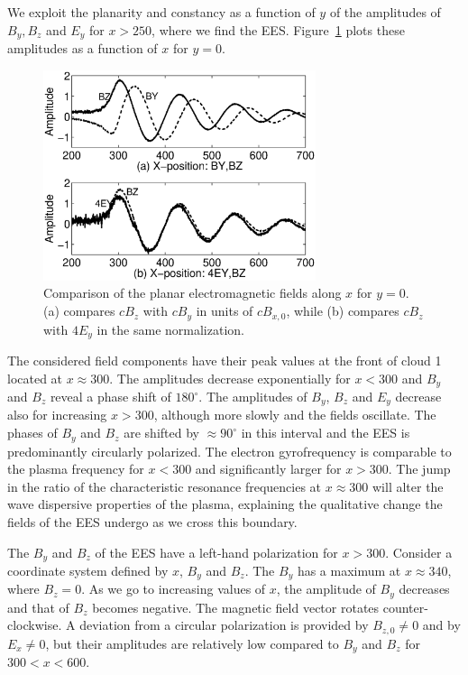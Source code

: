 \documentclass[structabstract]{aa}
\begin{document}
We exploit the planarity and constancy as a function of $y$ of the 
amplitudes of $B_y,B_z$ and $E_y$ for $x>250$, where we find the EES. 
Figure~\ref{Fig3} plots these amplitudes as a function of $x$ for $y=0$.
\begin{figure}
\centering
\includegraphics[width=8cm]{Fig3.eps}
\caption{Comparison of the planar electromagnetic fields along $x$ for 
$y=0$. (a) compares $cB_z$ with $cB_y$ in units of $cB_{x,0}$, while (b) 
compares $cB_z$ with $4E_y$ in the same normalization.}\label{Fig3}
\end{figure}
The considered field components have their peak values at the front 
of cloud 1 located at $x \approx 300$. The amplitudes decrease
exponentially for $x<300$ and $B_y$ and $B_z$ reveal a phase shift of
$180^\circ$. The amplitudes of $B_y$, $B_z$ and $E_y$ decrease also for 
increasing $x>300$, although more slowly and the fields oscillate. The 
phases of $B_y$ and $B_z$ are shifted by $\approx 90^\circ$ in this 
interval and the EES is predominantly 
circularly polarized. The electron gyrofrequency is comparable to the plasma 
frequency for $x<300$ and significantly larger for $x>300$. The jump in the 
ratio of the characteristic resonance frequencies at $x\approx 300$ will 
alter the wave dispersive properties of the plasma, explaining the qualitative
change the fields of the EES undergo as we cross this boundary.

The $B_y$ and $B_z$ of the EES have a left-hand polarization for $x>300$. 
Consider a coordinate system defined by $x$, $B_y$ and $B_z$. The $B_y$ 
has a maximum at $x\approx 340$, where $B_z = 0$. As we go to increasing 
values of $x$, the amplitude of $B_y$ decreases and that of $B_z$ becomes 
negative. The magnetic field vector rotates counter-clockwise. A deviation 
from a circular polarization is provided by $B_{z,0} \neq 0$ and by $E_x 
\neq 0$, but their amplitudes are relatively low compared to $B_y$ and $B_z$ 
for $300 < x < 600$. 
\end{document}
